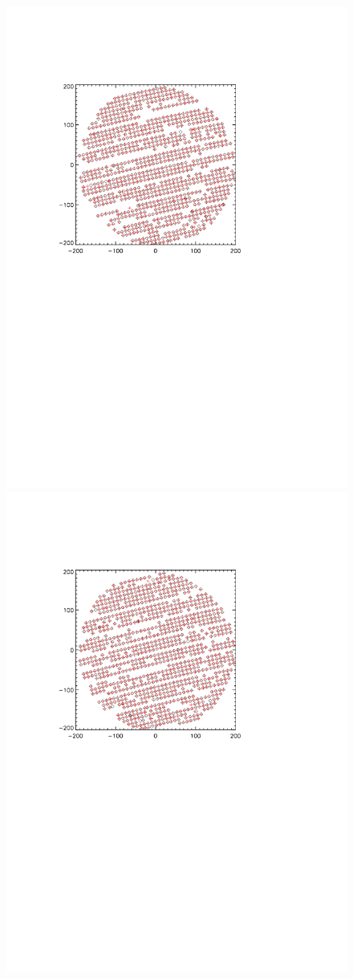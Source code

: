 \begin{figure}[htp]
\begin{center}
\includegraphics[trim=2cm 14cm 5cm 4cm, clip=true,width=0.6\linewidth]{Figures/A1_test_positions.pdf}
\includegraphics[trim=2cm 14cm 5cm 4cm, clip=true,width=0.6\linewidth]{Figures/A3_test_positions.pdf}

\end{center}
\end{figure}
